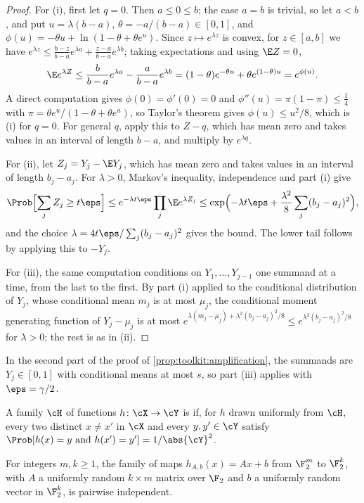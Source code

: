 \begin{refsection}
\begin{proof}
For (i), first let $q=0$. Then $a\le0\le b$; the case $a=b$ is trivial, so let $a<b$, and put $u=\lambda(b-a)$, $\theta=-a/(b-a)\in[0,1]$, and $\phi(u)=-\theta u+\ln(1-\theta+\theta e^u)$. Since $z\mapsto e^{\lambda z}$ is convex, for $z\in[a,b]$ we have $e^{\lambda z}\le\frac{b-z}{b-a}e^{\lambda a}+\frac{z-a}{b-a}e^{\lambda b}$; taking expectations and using $\E Z=0$,
\[
\E e^{\lambda Z}\le\frac{b}{b-a}e^{\lambda a}-\frac{a}{b-a}e^{\lambda b}=(1-\theta)e^{-\theta u}+\theta e^{(1-\theta)u}=e^{\phi(u)}.
\]
A direct computation gives $\phi(0)=\phi'(0)=0$ and $\phi''(u)=\pi(1-\pi)\le\frac14$ with $\pi=\theta e^u/(1-\theta+\theta e^u)$, so Taylor's theorem gives $\phi(u)\le u^2/8$, which is (i) for $q=0$. For general $q$, apply this to $Z-q$, which has mean zero and takes values in an interval of length $b-a$, and multiply by $e^{\lambda q}$.

For (ii), let $Z_j=Y_j-\E Y_j$, which has mean zero and takes values in an interval of length $b_j-a_j$. For $\lambda>0$, Markov's inequality, independence and part (i) give
\[
\Prob\Bigl[\sum_jZ_j\ge t\eps\Bigr]\le e^{-\lambda t\eps}\prod_j\E e^{\lambda Z_j}\le\exp\Bigl(-\lambda t\eps+\frac{\lambda^2}{8}\sum_j(b_j-a_j)^2\Bigr),
\]
and the choice $\lambda=4t\eps/\sum_j(b_j-a_j)^2$ gives the bound. The lower tail follows by applying this to $-Y_j$.

For (iii), the same computation conditions on $Y_1,\dots,Y_{j-1}$ one summand at a time, from the last to the first. By part (i) applied to the conditional distribution of $Y_j$, whose conditional mean $m_j$ is at most $\mu_j$, the conditional moment generating function of $Y_j-\mu_j$ is at most $e^{\lambda(m_j-\mu_j)+\lambda^2(b_j-a_j)^2/8}\le e^{\lambda^2(b_j-a_j)^2/8}$ for $\lambda>0$; the rest is as in (ii).
\end{proof}

In the second part of the proof of \cref{prop:toolkit:amplification}, the summands are $Y_j\in[0,1]$ with conditional means at most $s$, so part (iii) applies with $\eps=\gamma/2$.

\begin{definition}\label{def:toolkit:pairwise}
A family $\cH$ of functions $h\colon\cX\to\cY$ is  if, for $h$ drawn uniformly from $\cH$, every two distinct $x\ne x'$ in $\cX$ and every $y,y'\in\cY$ satisfy $\Prob[h(x)=y\text{ and }h(x')=y']=1/\abs{\cY}^2$.
\end{definition}

\begin{lemma}\label{lem:toolkit:pairwisehash}
For integers $m,k\ge1$, the family of maps $h_{A,b}(x)=Ax+b$ from $\F_2^m$ to $\F_2^k$, with $A$ a uniformly random $k\times m$ matrix over $\F_2$ and $b$ a uniformly random vector in $\F_2^k$, is pairwise independent.
\end{lemma}


\end{refsection}
